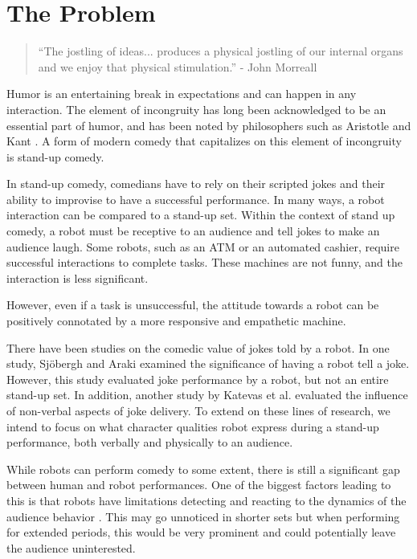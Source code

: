 \documentclass[onecolumn, draftclsnofoot,10pt, compsoc]{IEEEtran}
\begin{document}
\newpage
{}
\tableofcontents
\clearpage

\section{The Problem}

\begin{quote}
``The jostling of ideas... produces a physical jostling of our internal organs and we enjoy that physical stimulation.'' - John Morreall
\end{quote}
Humor is an entertaining break in expectations and can happen in any interaction. The element of incongruity has long been acknowledged to be an essential part of humor, and has been noted by philosophers such as Aristotle and Kant {\cite{StanfordHum:2016}}. A form of modern comedy that capitalizes on this element of incongruity is stand-up comedy.

In stand-up comedy, comedians have to rely on their scripted jokes and their ability to improvise to have a successful performance. In many ways, a robot interaction can be compared to a stand-up set. Within the context of stand up comedy, a robot must be receptive to an audience and tell jokes to make an audience laugh. Some robots, such as an ATM or an automated cashier, require successful interactions to complete tasks. These machines are not funny, and the interaction is less significant.

However, even if a task is unsuccessful, the attitude towards a robot can be positively connotated by a more responsive and empathetic machine. {\cite{DesignExBeh:2017}}

There have been studies on the comedic value of jokes told by a robot. In one study, Sjöbergh and Araki {\cite{RobotsMakeThings:2008}} examined the significance of having a robot tell a joke. However, this study evaluated joke performance by a robot, but not an entire stand-up set. In addition, another study by Katevas et al. {\cite{RobotComedyLab:2015}} evaluated the influence of non-verbal aspects of joke delivery. To extend on these lines of research, we intend to focus on what character qualities robot express during a stand-up performance, both verbally and physically to an audience.

While robots can perform comedy to some extent, there is still a significant gap between human and robot performances. One of the biggest factors leading to this is that robots have limitations detecting and reacting to the dynamics of the audience behavior {\cite{KatevasRobot:2014}}. This may go unnoticed in shorter sets but when performing for extended periods, this would be very prominent and could potentially leave the audience uninterested.
\end{document}
